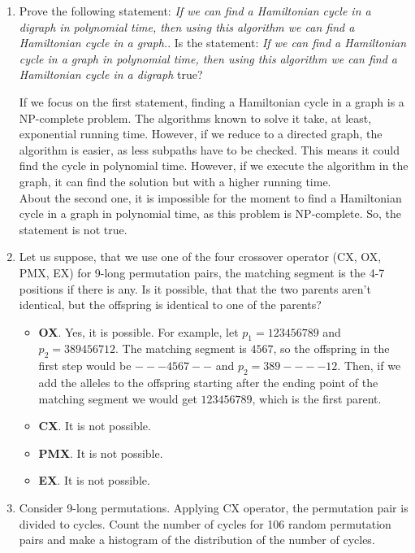 \documentclass[12pt,english]{article}
\newenvironment{statement}{\fontfamily{ptm}\selectfont}{\par}
\begin{document}
\begin{enumerate}

	\item
		\begin{statement}
		Prove the following statement: \emph{If we can find a Hamiltonian cycle in a digraph in polynomial time, then using this algorithm we can find a Hamiltonian cycle in a graph.}.
		Is the statement: \emph{If we can find a Hamiltonian cycle in a graph in polynomial time, then using this algorithm we can find a Hamiltonian cycle in a digraph} true?
		\end{statement}

		If we focus on the first statement, finding a Hamiltonian cycle in a graph is a NP-complete problem. The algorithms known to solve it take, at least, exponential running time. However, if we reduce to a directed graph, the algorithm is easier, as less subpaths have to be checked. This means it could find the cycle in polynomial time. However, if we execute the algorithm in the graph, it can find the solution but with a higher running time.\\

		About the second one, it is impossible for the moment to find a Hamiltonian cycle in a graph in polynomial time, as this problem is NP-complete. So, the statement is not true.


	\item
		\begin{statement}
		Let us suppose, that we use one of the four crossover operator (CX, OX, PMX, EX) for 9-long permutation pairs, the matching segment is the 4-7 positions if there is any. Is it possible, that that the two parents aren’t identical, but the offspring is identical to one of the parents?
		\end{statement}

		\begin{itemize}
			\item \textbf{OX}. Yes, it is possible. For example, let $p_1=123456789$ and $p_2=389456712$. The matching segment is $4567$, so the offspring in the first step would be $---4567--$ and $p_2=389----12$. Then, if we add the alleles to the offspring starting after the ending point of the matching segment we would get $123456789$, which is the first parent.
			\item \textbf{CX}. It is not possible.
			\item \textbf{PMX}. It is not possible.
			\item \textbf{EX}. It is not possible.
		\end{itemize}

	\item
		\begin{statement}
		Consider 9-long permutations. Applying CX operator, the permutation pair is divided to cycles. Count the number of cycles for 106 random permutation pairs and make a histogram of the distribution of the number of cycles.
		\end{statement}



\end{enumerate}
\end{document}
